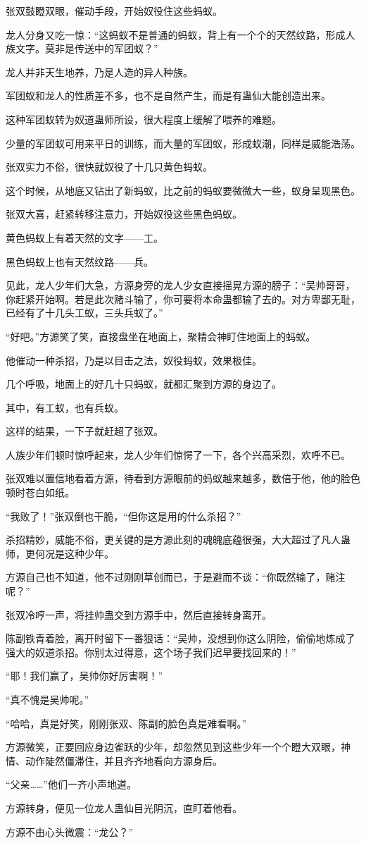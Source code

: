 \begin{this_body}
张双鼓瞪双眼，催动手段，开始奴役住这些蚂蚁。

龙人分身又吃一惊：“这蚂蚁不是普通的蚂蚁，背上有一个个的天然纹路，形成人族文字。莫非是传送中的军团蚁？”

龙人并非天生地养，乃是人造的异人种族。

军团蚁和龙人的性质差不多，也不是自然产生，而是有蛊仙大能创造出来。

这种军团蚁转为奴道蛊师所设，很大程度上缓解了喂养的难题。

少量的军团蚁可用来平日的训练，而大量的军团蚁，形成蚁潮，同样是威能浩荡。

张双实力不俗，很快就奴役了十几只黄色蚂蚁。

这个时候，从地底又钻出了新蚂蚁，比之前的蚂蚁要微微大一些，蚁身呈现黑色。

张双大喜，赶紧转移注意力，开始奴役这些黑色蚂蚁。

黄色蚂蚁上有着天然的文字——工。

黑色蚂蚁上也有天然纹路——兵。

见此，龙人少年们大急，方源身旁的龙人少女直接摇晃方源的膀子：“吴帅哥哥，你赶紧开始啊。若是此次赌斗输了，你可要将本命蛊都输了去的。对方卑鄙无耻，已经有了十几头工蚁，三头兵蚁了。”

“好吧。”方源笑了笑，直接盘坐在地面上，聚精会神盯住地面上的蚂蚁。

他催动一种杀招，乃是以目击之法，奴役蚂蚁，效果极佳。

几个呼吸，地面上的好几十只蚂蚁，就都汇聚到方源的身边了。

其中，有工蚁，也有兵蚁。

这样的结果，一下子就赶超了张双。

人族少年们顿时惊呼起来，龙人少年们惊愕了一下，各个兴高采烈，欢呼不已。

张双难以置信地看着方源，待看到方源眼前的蚂蚁越来越多，数倍于他，他的脸色顿时苍白如纸。

“我败了！”张双倒也干脆，“但你这是用的什么杀招？”

杀招精妙，威能不俗，更关键的是方源此刻的魂魄底蕴很强，大大超过了凡人蛊师，更何况是这种少年。

方源自己也不知道，他不过刚刚草创而已，于是避而不谈：“你既然输了，赌注呢？”

张双冷哼一声，将挂帅蛊交到方源手中，然后直接转身离开。

陈副铁青着脸，离开时留下一番狠话：“吴帅，没想到你这么阴险，偷偷地炼成了强大的奴道杀招。你别太过得意，这个场子我们迟早要找回来的！”

“耶！我们赢了，吴帅你好厉害啊！”

“真不愧是吴帅呢。”

“哈哈，真是好笑，刚刚张双、陈副的脸色真是难看啊。”

方源微笑，正要回应身边雀跃的少年，却忽然见到这些少年一个个瞪大双眼，神情、动作陡然僵滞住，并且齐齐地看向方源身后。

“父亲……”他们一齐小声地道。

方源转身，便见一位龙人蛊仙目光阴沉，直盯着他看。

方源不由心头微震：“龙公？”

\end{this_body}

